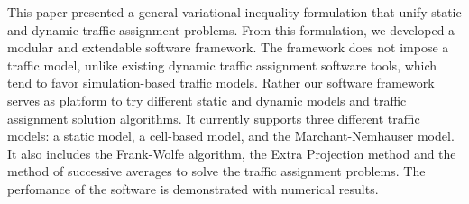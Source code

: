 This paper presented a general variational inequality formulation that unify static and dynamic traffic assignment problems. From this formulation, we developed a modular and extendable software framework. The framework does not impose a traffic model, unlike existing dynamic traffic assignment software tools, which tend to favor simulation-based traffic models. Rather our software framework serves as platform to try different static and dynamic models and traffic assignment solution algorithms. It currently supports three different traffic models: a static model, a cell-based model, and the Marchant-Nemhauser model. It also includes the Frank-Wolfe algorithm, the Extra Projection method and the method of successive averages to solve the traffic assignment problems. The perfomance of the software is demonstrated with numerical results. 